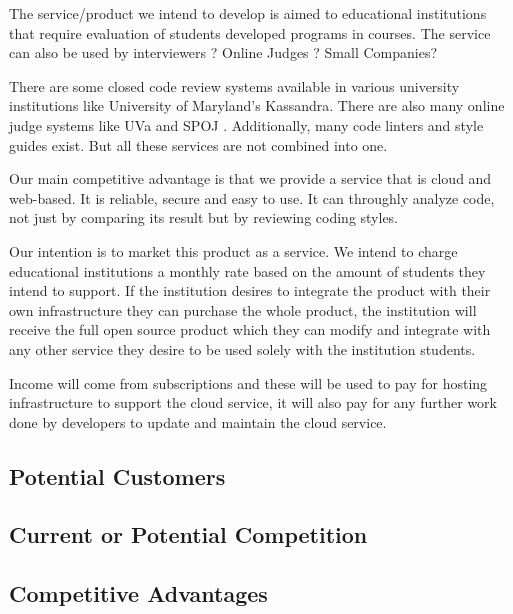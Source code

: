 
The service/product we intend to develop is aimed to educational institutions
that require evaluation of students developed programs in courses. The service
can also be used by interviewers ? Online Judges ? Small Companies?

There are some closed code review systems available in various university
institutions like \cite{Matt1994} University of Maryland's Kassandra. There are
also many online judge systems like UVa \cite{UVA} and SPOJ \cite{SPOJ}.
Additionally, many code linters and style guides exist. But all these services
are not combined into one.

Our main competitive advantage is that we provide a service that is cloud and
web-based. It is reliable, secure and easy to use. It can throughly analyze
code, not just by comparing its result but by reviewing coding styles.

Our intention is to market this product as a service. We intend to charge
educational institutions a monthly rate based on the amount of students they
intend to support. If the institution desires to integrate the product with
their own infrastructure they can purchase the whole product, the institution
will receive the full open source product which they can modify and integrate
with any other service they desire to be used solely with the institution
students.

Income will come from subscriptions and these will be used to pay for hosting
infrastructure to support the cloud service, it will also pay for any further
work done by developers to update and maintain the cloud service.

\subsection{Potential Customers}
\subsection{Current or Potential Competition}
\subsection{Competitive Advantages}
